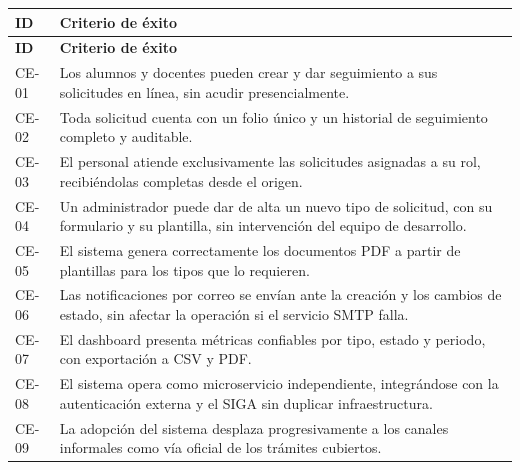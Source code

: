 \documentclass[12pt,letterpaper]{report}
\begin{document}
\begin{longtable}{|C{1.6cm}|L{12cm}|}
    \hline
    \textbf{ID} & \textbf{Criterio de éxito} \\
    \hline
    \endfirsthead
    \hline
    \textbf{ID} & \textbf{Criterio de éxito} \\
    \hline
    \endhead
    \hline
    \endfoot

    CE-01 & Los alumnos y docentes pueden crear y dar seguimiento a sus solicitudes en línea, sin acudir presencialmente. \\
    \hline
    CE-02 & Toda solicitud cuenta con un folio único y un historial de seguimiento completo y auditable. \\
    \hline
    CE-03 & El personal atiende exclusivamente las solicitudes asignadas a su rol, recibiéndolas completas desde el origen. \\
    \hline
    CE-04 & Un administrador puede dar de alta un nuevo tipo de solicitud, con su formulario y su plantilla, sin intervención del equipo de desarrollo. \\
    \hline
    CE-05 & El sistema genera correctamente los documentos PDF a partir de plantillas para los tipos que lo requieren. \\
    \hline
    CE-06 & Las notificaciones por correo se envían ante la creación y los cambios de estado, sin afectar la operación si el servicio SMTP falla. \\
    \hline
    CE-07 & El dashboard presenta métricas confiables por tipo, estado y periodo, con exportación a CSV y PDF. \\
    \hline
    CE-08 & El sistema opera como microservicio independiente, integrándose con la autenticación externa y el SIGA sin duplicar infraestructura. \\
    \hline
    CE-09 & La adopción del sistema desplaza progresivamente a los canales informales como vía oficial de los trámites cubiertos. \\
    \hline
\end{longtable}
\end{document}

